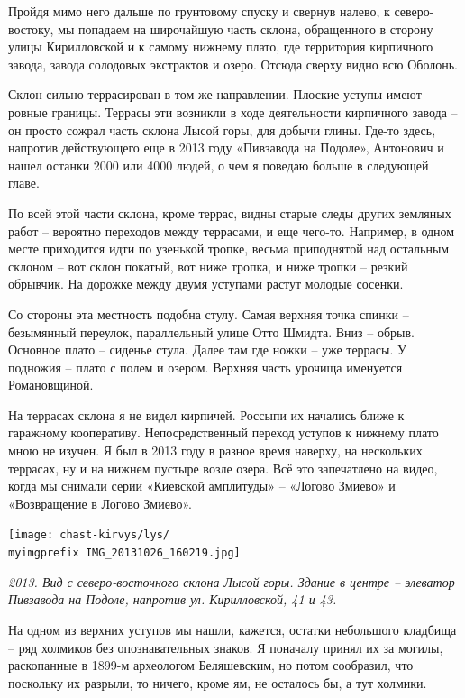 Пройдя мимо него дальше по грунтовому спуску и свернув налево, к северо-востоку, мы попадаем на широчайшую часть склона, обращенного в сторону улицы Кирилловской и к самому нижнему плато, где территория кирпичного завода, завода солодовых экстрактов и озеро. Отсюда сверху видно всю Оболонь.

Склон сильно террасирован в том же направлении. Плоские уступы имеют ровные границы. Террасы эти возникли в ходе деятельности кирпичного завода – он просто сожрал часть склона Лысой горы, для добычи глины. Где-то здесь, напротив действующего еще в 2013 году «Пивзавода на Подоле», Антонович и нашел останки 2000 или 4000 людей, о чем я поведаю больше в следующей главе.

По всей этой части склона, кроме террас, видны старые следы других земляных работ – вероятно переходов между террасами, и еще чего-то. Например, в одном месте приходится идти по узенькой тропке, весьма приподнятой над остальным склоном – вот склон покатый, вот ниже тропка, и ниже тропки – резкий обрывчик. На дорожке между двумя уступами растут молодые сосенки.
 
Со стороны эта местность подобна стулу. Самая верхняя точка спинки – безымянный переулок, параллельный улице Отто Шмидта. Вниз – обрыв. Основное плато – сиденье стула. Далее там где ножки – уже террасы. У подножия – плато с полем и озером. Верхняя часть урочища именуется Романовщиной.

На террасах склона я не видел кирпичей. Россыпи их начались ближе к гаражному кооперативу. Непосредственный переход уступов к нижнему плато мною не изучен. Я был в 2013 году в разное время наверху, на нескольких террасах, ну и на нижнем пустыре возле озера. Всё это запечатлено на видео, когда мы снимали серии «Киевской амплитуды» – «Логово Змиево» и «Возвращение в Логово Змиево».
\vspace*{\fill}
\begin{center}
\texttt{[image: chast-kirvys/lys/\\myimgprefix IMG\_20131026\_160219.jpg]}

\textit{2013. Вид с северо-восточного склона Лысой горы. Здание в центре – элеватор Пивзавода на Подоле, напротив ул. Кирилловской, 41 и 43.}
\end{center} 
\vspace*{\fill}
\newpage

На одном из верхних уступов мы нашли, кажется, остатки небольшого кладбища – ряд холмиков без опознавательных знаков. Я поначалу принял их за могилы, раскопанные в 1899-м археологом Беляшевским, но потом сообразил, что поскольку их разрыли, то ничего, кроме ям, не осталось бы, а тут холмики.

